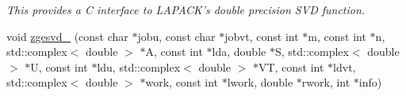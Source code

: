 \begin{DoxyCompactItemize}
\begin{DoxyCompactList}\small\item\em This provides a C interface to L\-A\-P\-A\-C\-K's double precision S\-V\-D function. \end{DoxyCompactList}\item 
\hypertarget{namespacekeycpp_afa5e2f74110f53bd288c15ce1f183f9b}{void \hyperlink{namespacekeycpp_afa5e2f74110f53bd288c15ce1f183f9b}{zgesvd\-\_\-} (const char $\ast$jobu, const char $\ast$jobvt, const int $\ast$m, const int $\ast$n, std\-::complex$<$ double $>$ $\ast$A, const int $\ast$lda, double $\ast$S, std\-::complex$<$ double $>$ $\ast$U, const int $\ast$ldu, std\-::complex$<$ double $>$ $\ast$V\-T, const int $\ast$ldvt, std\-::complex$<$ double $>$ $\ast$work, const int $\ast$lwork, double $\ast$rwork, int $\ast$info)}\label{namespacekeycpp_afa5e2f74110f53bd288c15ce1f183f9b}


\end{DoxyCompactItemize}
